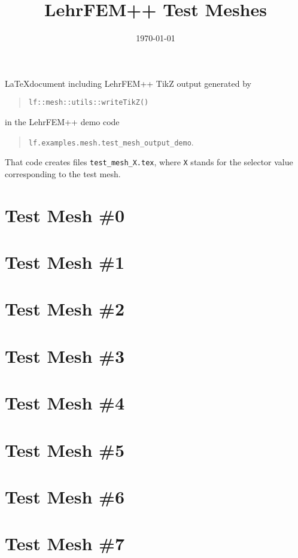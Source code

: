\documentclass[a4wide]{article}
\title{LehrFEM++ Test Meshes}
\date{\today}
\begin{document}
\maketitle

\noindent
\LaTeX document including LehrFEM++ TikZ output generated by
\begin{quote}
  \texttt{lf::mesh::utils::writeTikZ()}
\end{quote}
in the LehrFEM++ demo code
\begin{quote}
  \texttt{lf.examples.mesh.test\_mesh\_output\_demo}.
\end{quote}
That code creates
files \texttt{test\_mesh\_X.tex}, where \texttt{X} stands for the
selector value corresponding to the test mesh.

\section{Test Mesh \#0}

 

\section{Test Mesh \#1}

 

\section{Test Mesh \#2}

 

\section{Test Mesh \#3}

 

\section{Test Mesh \#4}

 

\section{Test Mesh \#5}

 

\section{Test Mesh \#6}

 

\section{Test Mesh \#7}

 
\end{document}
